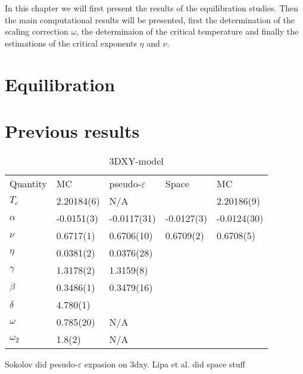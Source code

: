 %
In this chapter we will first present the results of the equilibration studies. Then the main computational results will be presented, first the determination of the scaling correction $\omega$, the determinaion of the critical temperature and finally the estimations of the critical exponents $\eta$ and $\nu$.
\section{Equilibration}

\section{Previous results}
\begin{table}[!htpb]
\begin{center}
\begin{tabular}{l l l l l}
  Quantity 	& MC\cite{Campostrini2006} 	& pseudo-$\varepsilon$\cite{Sokolov2016} & Space\cite{Lipa2003}	& MC\cite{Jeon2012} \\
  $T_c$		& 2.20184(6)			& N/A					&			& 2.20186(9)\\
  $\alpha $	& -0.0151(3)			& -0.0117(31)				&-0.0127(3)		& -0.0124(30)\\
  $\nu	  $     & 0.6717(1) 			& 0.6706(10)				&0.6709(2)		& 0.6708(5)\\
  $\eta   $     & 0.0381(2) 			& 0.0376(28) 				&			& \\
  $\gamma $	& 1.3178(2) 			& 1.3159(8)				&			& \\
  $\beta  $     & 0.3486(1) 			& 0.3479(16)				&			& \\
  $\delta $	& 4.780(1) 			& 					&			& \\
  $\omega $     & 0.785(20) 			& N/A					&			& \\
  $\omega_2$ 	& 1.8(2) 			& N/A					&			& \\
\end{tabular}
\end{center}
\caption{3DXY-model }
\end{table}
Sokolov did pesudo-$\varepsilon$ expasion on 3dxy.\cite{Sokolov2016}
Lipa et al. did space stuff \cite{Lipa2003}

